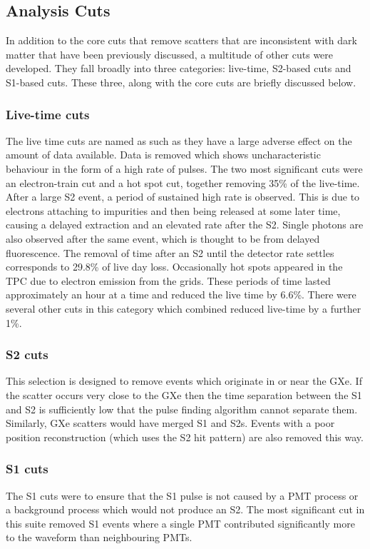 \subsection{Analysis Cuts}
\par
In addition to the core cuts that remove scatters that are inconsistent with dark matter that have been previously discussed, a multitude of other cuts were developed.
They fall broadly into three categories: live-time, S2-based cuts and S1-based cuts.
These three, along with the core cuts are briefly discussed below.


\subsubsection{Live-time cuts}
The live time cuts are named as such as they have a large adverse effect on the amount of data available.
Data is removed which shows uncharacteristic behaviour in the form of a high rate of pulses.
The two most significant cuts were an electron-train cut and a hot spot cut, together removing 35\% of the live-time.
After a large S2 event, a period of sustained high rate is observed. 
This is due to electrons attaching to impurities and then being released at some later time, causing a delayed extraction and an elevated rate after the S2.
Single photons are also observed after the same event, which is thought to be from delayed fluorescence.
The removal of time after an S2 until the detector rate settles corresponds to 29.8\% of live day loss.
Occasionally hot spots appeared in the TPC due to electron emission from the grids. 
These periods of time lasted approximately an hour at a time and reduced the live time by 6.6\%.
There were several other cuts in this category which combined reduced live-time by a further 1\%.

\subsubsection{S2 cuts}
This selection is designed to remove events which originate in or near the GXe. 
If the scatter occurs very close to the GXe then the time separation between the S1 and S2 is sufficiently low that the pulse finding algorithm cannot separate them. 
Similarly, GXe scatters would have merged S1 and S2s. 
Events with a poor position reconstruction (which uses the S2 hit pattern) are also removed this way.

\subsubsection{S1 cuts}
The S1 cuts were to ensure that the S1 pulse is not caused by a PMT process or a background process which would not produce an S2.
The most significant cut in this suite removed S1 events where a single PMT contributed significantly more to the waveform than neighbouring PMTs.

